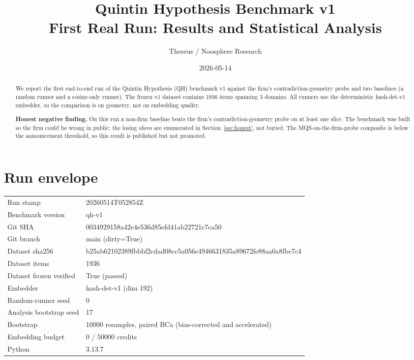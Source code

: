 \documentclass[11pt]{article}
\title{Quintin Hypothesis Benchmark v1 \\ \large First Real Run: Results and Statistical Analysis}
\author{Theseus / Noosphere Research}
\date{2026-05-14}
\begin{document}
\maketitle

\begin{abstract}We report the first end-to-end run of the Quintin Hypothesis (QH) benchmark v1 against the firm's contradiction-geometry probe and two baselines (a random runner and a cosine-only runner). The frozen v1 dataset contains 1936 items spanning 3 domains. All runners use the deterministic hash-det-v1 embedder, so the comparison is on geometry, not on embedding quality. \par\textbf{Honest negative finding.} On this run a non-firm baseline beats the firm's contradiction-geometry probe on at least one slice. The benchmark was built so the firm could be wrong in public; the losing slices are enumerated in Section~\ref{sec:honest}, not buried. The MQS-on-the-firm-probe composite is below the announcement threshold, so this result is published but not promoted.\end{abstract}

\section{Run envelope}
\begin{longtable}{l l}
\toprule
Run stamp & 20260514T052854Z \\
Benchmark version & qh-v1 \\
Git SHA & 0034929158a42e4e536d85efd41ab22721c7ca50 \\
Git branch & main (dirty=True) \\
Dataset sha256 & b25ab62102389fbbbf2cdad08cc5a056e4946631835a89672fe88aa0a8fbe7c4 \\
Dataset items & 1936 \\
Dataset frozen verified & True (passed) \\
Embedder & hash-det-v1 (dim 192) \\
Random-runner seed & 0 \\
Analysis bootstrap seed & 17 \\
Bootstrap & 10000 resamples, paired BCa (bias-corrected and accelerated) \\
Embedding budget & 0 / 50000 credits \\
Python & 3.13.7 \\
\bottomrule
\end{longtable}
\end{document}
